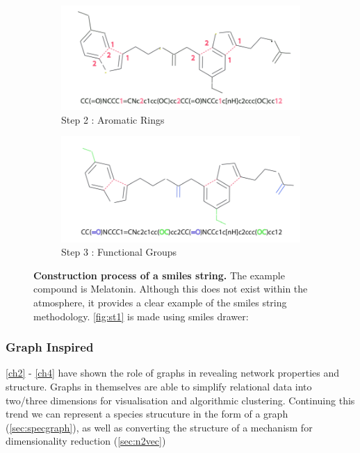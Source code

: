 \begin{figure}[H]
     \begin{subfigure}[b]{0.495\textwidth}
         \centering
         \includegraphics[width=\textwidth]{4fig/sm3.png}
         \caption{Step 2 : Aromatic Rings}
         \label{fig:st3}
     \end{subfigure}
     \hfill
     \begin{subfigure}[b]{0.495\textwidth}
        \centering
            \includegraphics[width=\textwidth]{4fig/sm2.png}
            \caption{Step 3 : Functional Groups }
            \label{fig:st4}
        \end{subfigure}

        \caption{ \textbf{Construction process of a smiles string.} The example compound is Melatonin. Although this does not exist within the atmosphere, it provides a clear example of the smiles string methodology. \autoref{fig:st1} is made using smiles drawer: \citep{smilesdrawer} }
        \label{fig:smiles}
\end{figure}


\subsubsection{Graph Inspired}

\autoref{ch2} - \ref{ch4} have shown the role of graphs in revealing network properties and structure. Graphs in themselves are able to simplify relational data into two/three dimensions for visualisation and algorithmic clustering. Continuing this trend we can represent a species strucuture in the form of a graph (\autoref{sec:specgraph}), as well as converting the structure of a mechanism for dimensionality reduction (\autoref{sec:n2vec})


